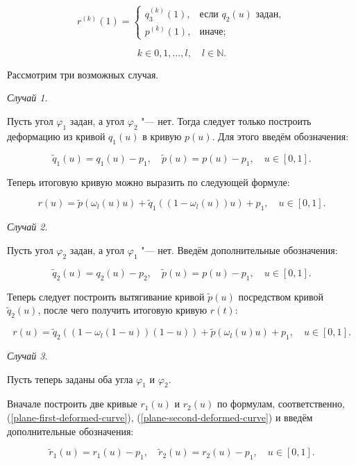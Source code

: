 \begin{equation*}
r^{(k)}(1)=
  \begin{cases}
    q_3^{(k)}(1), & \text{если $q_2(u)$ задан}, \\
    p^{(k)}(1),   & \text{иначе};
  \end{cases}
\end{equation*}

$$
k \in {0,1,\dots,l}, \quad l \in \mathbb{N}.
$$

Рассмотрим три возможных случая.

\bigskip
\textit{Случай 1.}

Пусть угол $\varphi_1$ задан, а угол $\varphi_2$ "--- нет. Тогда следует только построить деформацию из кривой $q_1(u)$ в
кривую $p(u)$. Для этого введём обозначения:

$$
\tilde q_1(u)=q_1(u)-p_1, \quad \tilde p(u)=p(u)-p_1, \quad u \in [0,1].
$$

Теперь итоговую кривую можно выразить по следующей формуле:

\begin{equation}
r(u)=\tilde p(\omega_l(u)u)+\tilde q_1((1-\omega_l(u))u)+p_1, \quad u \in [0,1].
\label{plane-first-deformed-curve}
\end{equation}

\bigskip
\textit{Случай 2.}

Пусть угол $\varphi_2$ задан, а угол $\varphi_1$ "--- нет. Введём дополнительные обозначения:

$$
\tilde q_2(u)=q_2(u)-p_2, \quad \tilde p(u)=p(u)-p_1, \quad u \in [0,1].
$$

Теперь следует построить вытягивание кривой $\tilde p(u)$ посредством кривой $\tilde q_2(u)$, после чего получить
итоговую кривую $r(t)$:

\begin{equation}
r(u)=\tilde q_2((1-\omega_l(1-u))(1-u))+\tilde p(\omega_l(u)u)+p_1, \quad u \in [0,1].
\label{plane-second-deformed-curve}
\end{equation}

\bigskip
\textit{Случай 3.}

Пусть теперь заданы оба угла $\varphi_1$ и $\varphi_2$.

Вначале построить две кривые $r_1(u)$ и $r_2(u)$ по формулам, соответственно, (\ref{plane-first-deformed-curve}),
(\ref{plane-second-deformed-curve}) и введём дополнительные обозначения:

$$
\tilde r_1(u)=r_1(u)-p_1, \quad \tilde r_2(u)=r_2(u)-p_1, \quad u \in [0,1].
$$

